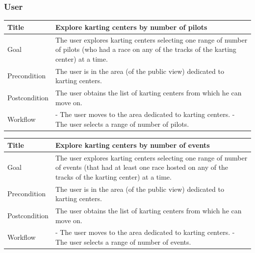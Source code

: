 \documentclass{beamer}
\begin{document}
\begin{frame}
    \frametitle{User}
    \begin{table}
        \tiny
        \begin{tabular}{|p{2cm}|p{6cm}|}
        \hline
        Title & \textbf{Explore karting centers by number of pilots} \\
        \hline
        Goal & The user explores karting centers selecting one range of number of pilots (who had a race on 
        any of the tracks of the karting center) at a time. \\
        \hline
        Precondition & The user is in the area (of the public view) dedicated to karting centers.\\
        \hline
        Postcondition & The user obtains the list of karting centers from which he can move on.\\
        \hline
        Workflow &
        - The user moves to the area dedicated to karting centers. \newline
        - The user selects a range of number of pilots. \\
        \hline
        \end{tabular}
\end{table}

\begin{table}
    \tiny
    \begin{tabular}{|p{2cm}|p{6cm}|}
    \hline
    Title & \textbf{Explore karting centers by number of events} \\
    \hline
    Goal & The user explores karting centers selecting one range of number of events (that had
    at least one race hosted on 
    any of the tracks of the karting center) at a time. \\
    \hline
    Precondition & The user is in the area (of the public view) dedicated to karting centers.\\
    \hline
    Postcondition & The user obtains the list of karting centers from which he can move on.\\
    \hline
    Workflow &
    - The user moves to the area dedicated to karting centers. \newline
    - The user selects a range of number of events. \\
    \hline
    \end{tabular}
\end{table}
\end{frame}

\end{document}

